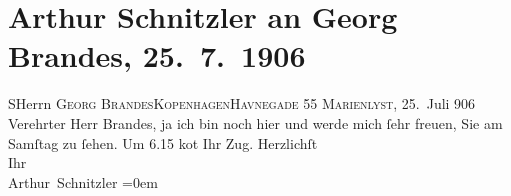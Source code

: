 

         
         \renewcommand{\erwaehntePersonen}{Personen: Georg Brandes}
         \renewcommand{\erwaehnteOrte}{Orte: Havnegade, Kopenhagen, Marienlyst}
         \renewcommand{\erwaehnteWerke}{}
               \section[Arthur Schnitzler an Georg Brandes, 25. 7. 1906]{ Arthur Schnitzler an Georg Brandes, 25. 7. 1906}\nopagebreak{}\rehead{ }\begin{ledgroupsized}[t]{13cm}\normalsize\beginnumbering \toendnotes[C]{\smallbreak\pagebreak[2]} 
\pstart{}\textsc{{\pb}S}\pend{}\pstart{}Herrn \textsc{Georg Brandes}\pend{}\pstart{}\textsc{Kopenhagen}\pend{}\pstart{}\textsc{Havnegade} 55\pend{}{\bigskip}\pstart
           \raggedleft{}{\pb}\textsc{Marienlyst}, 25. Juli 906\pend
           \pstart{}Verehrter Herr Brandes,\pend\pstart
           ja ich bin noch hier und werde mich ſehr freuen, Sie am Samſtag zu
                    ſehen. Um 6.15 ko{\geminationm}t Ihr Zug.\pend
           \pstart
           Herzlichſt{\\[\baselineskip]}Ihr{\\[\baselineskip]}\spacefill\mbox{Arthur Schnitzler}\pend
           \leftskip=0em{}
         
         \endnumbering{}\end{ledgroupsized}  \newcommand{\dateiname}{L01616}\newcommand{\titel}{Arthur Schnitzler an Georg Brandes, 25. 7. 1906}\newcommand{\editorInnen}{Martin Anton Müller und Gerd-Hermann Susen}
      